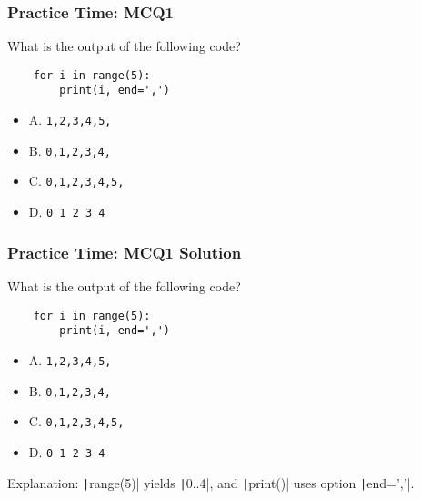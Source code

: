 \documentclass{beamer}
\begin{document}
\begin{frame}[fragile]
    \frametitle{Practice Time: MCQ1}
    What is the output of the following code?
    \begin{verbatim}
    for i in range(5):
        print(i, end=',')
    \end{verbatim}
    \begin{itemize}
        \item A. \texttt{1,2,3,4,5,}
        \item B. \texttt{0,1,2,3,4,}
        \item C. \texttt{0,1,2,3,4,5,}
        \item D. \texttt{0 1 2 3 4}
    \end{itemize}
\end{frame}
\begin{frame}[fragile]
    \frametitle{Practice Time: MCQ1 Solution}
    What is the output of the following code?
    \begin{verbatim}
    for i in range(5):
        print(i, end=',')
    \end{verbatim}
    \begin{itemize}
        \item A. \texttt{1,2,3,4,5,}
        \item \alert{B. \texttt{0,1,2,3,4,}}
        \item C. \texttt{0,1,2,3,4,5,}
        \item D. \texttt{0 1 2 3 4}
    \end{itemize}

    Explanation: \texttt|range(5)| yields \texttt|0..4|, and
    \texttt|print()| uses option \texttt|end=','|.
\end{frame}
\end{document}
